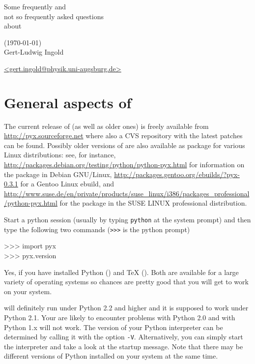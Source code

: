 \documentclass[11pt,DIV14]{scrartcl}
\begin{document}
\begin{center}
\LARGE\sffamily Some frequently and\\ 
not so frequently asked questions\\ 
about \PyX\\
\par
{\small\sffamily (\today)}\\[1truecm]
\large
Gert-Ludwig Ingold \par
\href{mailto:gert.ingold@physik.uni-augsburg.de}{\url{<gert.ingold@physik.uni-augsburg.de>}}
\end{center}
\toc
\newpage

\section{General aspects of \PyX}
{}
{The current release of \PyX{} (as well as older ones) is freely available 
from \url{http://pyx.sourceforge.net} where also a CVS repository with the 
latest patches can be found. Possibly older versions of \PyX{} are
also available as package for
various Linux distributions: see, for instance,  
\url{http://packages.debian.org/testing/python/python-pyx.html} for
information on the \PyX{} package in Debian GNU/Linux, 
\url{http://packages.gentoo.org/ebuilds/?pyx-0.3.1} for a Gentoo Linux
ebuild, and
\url{http://www.suse.de/en/private/products/suse_linux/i386/packages_professional/python-pyx.html}
for the \PyX{} package in the SUSE LINUX professional distribution.
}

{}
{Start a python session (usually by typing \texttt{python} at the system
prompt) and then type the following two commands (\texttt{>>>} is the python 
prompt)
\begin{progcode}
>>> import pyx\\
>>> pyx.\us\us{}version\us\us
\end{progcode}
}

{}
{Yes, if you have installed Python ()
and \TeX{} (). Both are available for
a large variety of operating systems so chances are pretty good that you will 
get \PyX{} to work on your system.
}

{}
{\PyX{} will definitely run under Python 2.2 and higher and it is supposed
to work under Python 2.1. Your are likely to encounter problems with Python 2.0
and with Python 1.x \PyX{} will not work. The version of your Python interpreter
can be determined by calling it with the option \texttt{-V}. Alternatively,
you can simply start the interpreter and take a look at the startup message.
Note that there may be different versions of Python installed on your system
at the same time.
}
\end{document}
